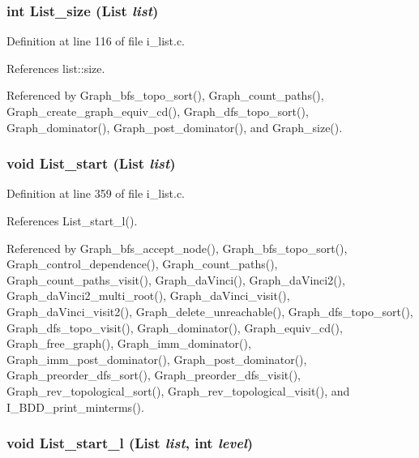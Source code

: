 \subsubsection{\setlength{\rightskip}{0pt plus 5cm}int List\_\-size (\bf{List} {\em list})}\label{i__list_8c_1fc62b2ee8fef0e5b90fb891a804afe5}




Definition at line 116 of file i\_\-list.c.

References list::size.

Referenced by Graph\_\-bfs\_\-topo\_\-sort(), Graph\_\-count\_\-paths(), Graph\_\-create\_\-graph\_\-equiv\_\-cd(), Graph\_\-dfs\_\-topo\_\-sort(), Graph\_\-dominator(), Graph\_\-post\_\-dominator(), and Graph\_\-size().
\subsubsection{\setlength{\rightskip}{0pt plus 5cm}void List\_\-start (\bf{List} {\em list})}\label{i__list_8c_ae4cc14a4e764e7841627ade10f15766}




Definition at line 359 of file i\_\-list.c.

References List\_\-start\_\-l().

Referenced by Graph\_\-bfs\_\-accept\_\-node(), Graph\_\-bfs\_\-topo\_\-sort(), Graph\_\-control\_\-dependence(), Graph\_\-count\_\-paths(), Graph\_\-count\_\-paths\_\-visit(), Graph\_\-da\-Vinci(), Graph\_\-da\-Vinci2(), Graph\_\-da\-Vinci2\_\-multi\_\-root(), Graph\_\-da\-Vinci\_\-visit(), Graph\_\-da\-Vinci\_\-visit2(), Graph\_\-delete\_\-unreachable(), Graph\_\-dfs\_\-topo\_\-sort(), Graph\_\-dfs\_\-topo\_\-visit(), Graph\_\-dominator(), Graph\_\-equiv\_\-cd(), Graph\_\-free\_\-graph(), Graph\_\-imm\_\-dominator(), Graph\_\-imm\_\-post\_\-dominator(), Graph\_\-post\_\-dominator(), Graph\_\-preorder\_\-dfs\_\-sort(), Graph\_\-preorder\_\-dfs\_\-visit(), Graph\_\-rev\_\-topological\_\-sort(), Graph\_\-rev\_\-topological\_\-visit(), and I\_\-BDD\_\-print\_\-minterms().
\subsubsection{\setlength{\rightskip}{0pt plus 5cm}void List\_\-start\_\-l (\bf{List} {\em list}, int {\em level})}\label{i__list_8c_7bd3655aa75a18064dbd0e975b4c05c3}




